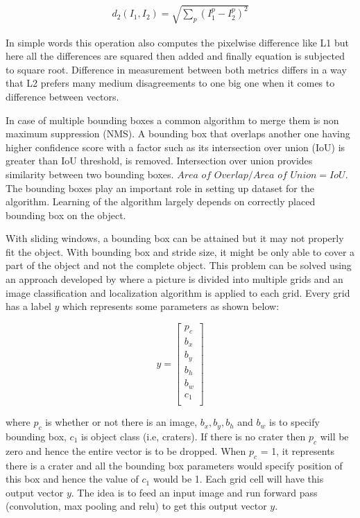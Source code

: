\documentclass[11pt]{article}
\begin{document}
\begin{align*}
d_2 (I_1, I_2) = \sqrt{\sum_{p} \left( I^p_1 - I^p_2 \right)^2}
\end{align*}
 
In simple words this operation also computes the pixelwise difference like L1 but here all the differences are squared then added and finally equation is subjected to square root. Difference in measurement between both metrics differs in a way that L2 prefers many medium disagreements to one big one when it comes to difference between vectors.
 
In case of multiple bounding boxes a common algorithm to merge them is non maximum suppression (NMS). A bounding box that overlaps another one having higher confidence score with a factor such as its intersection over union (IoU) is greater than IoU threshold, is removed. Intersection over union provides similarity between two bounding boxes. ${\textit{Area of Overlap}} /{\textit{Area of Union}} = IoU
$. The bounding boxes play an important role in setting up dataset for the algorithm. Learning of the algorithm largely depends on correctly placed bounding box on the object.

With sliding windows, a bounding box can be attained but it may not properly fit the object. With bounding box and stride size, it might be only able to cover a part of the object and not the complete object. This problem can be solved using an approach developed by \cite{redmon_you_2016} where a picture is divided into multiple grids and an image classification and localization algorithm is applied to each grid. Every grid has a label $y$ which represents some parameters as shown below:

$$
y =
\begin{bmatrix}
p_c\\
b_x\\
b_y\\
b_h\\
b_w\\
c_1\\
\end{bmatrix}
$$

where $p_c$ is whether or not there is an image, $b_x, b_y, b_h$ and $b_w$ is to specify bounding box, $c_1$ is object class (i.e, craters). If there is no crater then $p_c$ will be zero and hence the entire vector is to be dropped. When $p_c$ = 1, it represents there is a crater and all the bounding box parameters would specify position of this box and hence the value of $c_1$ would be 1. Each grid cell will have this output vector $y$. The idea is to feed an input image and run forward pass (convolution, max pooling and relu) to get this output vector $y$.
\end{document}
